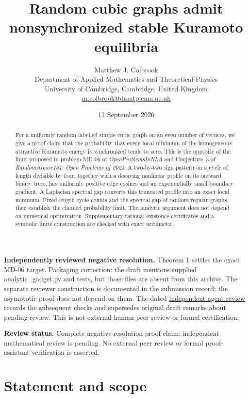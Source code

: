 \documentclass[11pt]{article}
\title{Random cubic graphs admit nonsynchronized stable Kuramoto equilibria}
\author{Matthew J. Colbrook\\\small Department of Applied Mathematics and Theoretical Physics\\\small University of Cambridge, Cambridge, United Kingdom\\\small\href{mailto:m.colbrook@damtp.cam.ac.uk}{m.colbrook@damtp.cam.ac.uk}}
\date{11 September 2026}
\theoremstyle{definition}
\theoremstyle{remark}
\begin{document}
\maketitle

\noindent\textbf{Independently reviewed negative resolution.} Theorem 1 settles the exact MD-06 target. Packaging correction: the draft mentions supplied analytic\_gadget.py and tests, but those files are absent from this archive. The separate reviewer construction is documented in the submission record; the asymptotic proof does not depend on them.
The dated \href{https://github.com/MColbrook/OpenProblemsInNLA/blob/codex/colbrook-package-five-submissions/references/colbrook-discrepancy-2026-09-11/verification/reviews/MD-06-deterministic-review.md}{independent agent review} records the subsequent checks and supersedes original draft remarks about pending review. This is not external human peer review or formal certification.
\par\medskip
\vspace{2.5em}

\vspace{-2.5em}
\begin{abstract}
For a uniformly random labelled simple cubic graph on an even number of
vertices, we give a proof claim that the probability that every local minimum
of the homogeneous attractive Kuramoto energy is synchronized tends to zero.
This is the opposite of the limit proposed in problem MD-06 of
\emph{OpenProblemsInNLA} and Conjecture~3 of
\emph{Randomstrasse101: Open Problems of 2024}.
A two-by-two sign pattern on a cycle of length divisible by four, together
with a decaying nonlinear profile on its outward binary trees, has uniformly
positive edge cosines and an exponentially small boundary gradient.
A Laplacian spectral gap converts this truncated profile into an exact local
minimum. Fixed-length cycle counts and the spectral gap of random regular
graphs then establish the claimed probability limit. The analytic argument
does not depend on numerical optimization. Supplementary rational existence certificates and a symbolic finite
construction are checked with exact arithmetic.
\end{abstract}

\noindent\textbf{Review status.} Complete negative-resolution proof claim;
independent mathematical review is pending. No external peer review or formal
proof-assistant verification is asserted.

\section{Statement and scope}
\end{document}
